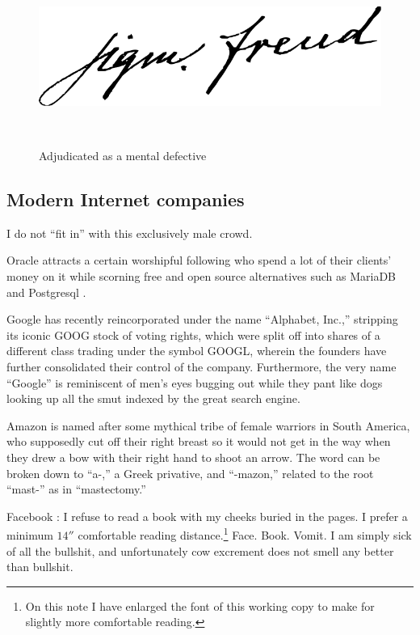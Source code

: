 \documentclass[letterpaper]{article}
\begin{document}
\begin{figure}
\begin{minipage}{0.45\textwidth}
	\includegraphics[width=1.0\textwidth]{683px-FreudSignature.png}
	\end{minipage}\\
	\caption{Adjudicated as a mental defective}
\end{figure}
\subsection{Modern Internet companies}
I do not ``fit in'' with this exclusively male crowd. 

Oracle \cite{orcl2016} attracts a certain worshipful following who spend a lot of their clients' money on it while scorning free and open source alternatives such as MariaDB \cite{mariadb2016} and Postgresql \cite{postgresql2016}.

Google \cite{page2016alphabet} has recently reincorporated under the name ``Alphabet, Inc.,'' stripping its iconic GOOG stock of voting rights, which were split off into shares of a different class trading under the symbol GOOGL, wherein the founders have further consolidated their control of the company.  Furthermore, the very name ``Google'' is reminiscent of men's eyes bugging out while they pant like dogs looking up all the smut indexed by the great search engine.

Amazon \cite{amazon2016} is named after some mythical tribe of female warriors in South America, who supposedly cut off their right breast so it would not get in the way when they drew a bow with their right hand to shoot an arrow.  The word can be broken down to ``a-,'' a Greek privative, and ``-mazon,'' related to the root ``mast-'' as in ``mastectomy.''

Facebook \cite{facebook2016}:  I refuse to read a book with my cheeks buried in the pages.  I prefer a minimum $14''$ comfortable reading distance.\footnote{On this note I have enlarged the font of this working copy to make for slightly more comfortable reading.} Face. Book. Vomit.  I am simply sick of all the bullshit, and unfortunately cow excrement does not smell any better than bullshit.

 {}
\end{document}
